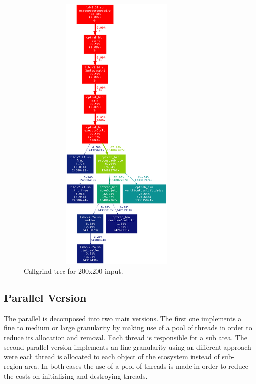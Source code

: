 \documentclass[10pt,a4paper,final]{report}
\begin{document}
\begin{figure}[H]
      \centering
      \includegraphics[height=14cm,width=10cm]{grafico_sp_200x200.png}
	        
      \caption{Callgrind tree for 200x200 input.}
      \label{fig_call_sp}
\end{figure}



\subsection{Parallel Version}

The parallel is decomposed into two main versions. The first one implements a fine to medium or large granularity by making use of a pool of threads in order to reduce its allocation and removal. Each thread is responsible for a sub area.  The second parallel version implements an fine granularity using an different approach were each thread is allocated to each object of the ecosystem instead of sub-region area. In both cases the use of a pool of threads is made in order to reduce the costs on initializing and destroying threads.
\end{document}
